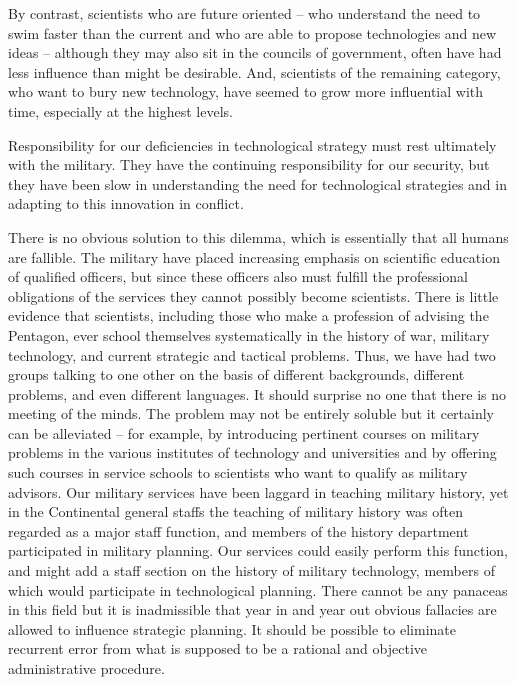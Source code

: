 By contrast, scientists who are future oriented -- who understand the need to swim faster than the current and who are able to propose technologies and new ideas -- although they may also sit in the councils of government, often have had less influence than might be desirable. And, scientists of the remaining category, who want to bury new technology, have seemed to grow more influential with time, especially at the highest levels.

Responsibility for our deficiencies in technological strategy must rest ultimately with the military. They have the continuing responsibility for our security, but they have been slow in understanding the need for technological strategies and in adapting to this innovation in conflict.

There is no obvious solution to this dilemma, which is essentially that all humans are fallible. The military have placed increasing emphasis on scientific education of qualified officers, but since these officers also must fulfill the professional obligations of the services they cannot possibly become scientists. There is little evidence that scientists, including those who make a profession of advising the Pentagon, ever school themselves systematically in the history of war, military technology, and current strategic and tactical problems. Thus, we have had two groups talking to one other on the basis of different backgrounds, different problems, and even different languages. It should surprise no one that there is no meeting of the minds. The problem may not be entirely soluble but it certainly can be alleviated -- for example, by introducing pertinent courses on military problems in the various institutes of technology and universities and by offering such courses in service schools to scientists who want to qualify as military advisors. Our military services have been laggard in teaching military history, yet in the Continental general staffs the teaching of military history was often regarded as a major staff function, and members of the history department participated in military planning. Our services could easily perform this function, and might add a staff section on the history of military technology, members of which would participate in technological planning. There cannot be any panaceas in this field but it is inadmissible that year in and year out obvious fallacies are allowed to influence strategic planning. It should be possible to eliminate recurrent error from what is supposed to be a rational and objective administrative procedure.

